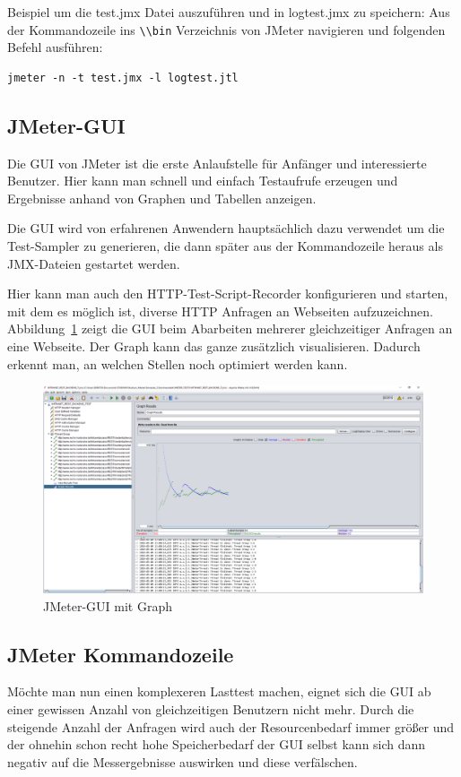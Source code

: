\documentclass[a4paper,12pt]{article}
\newcommand{\codeInLine}[1]{%
\colorbox{graybackgroundColor}{\lstinline{#1}} %
}
\begin{document}
Beispiel um die test.jmx Datei auszuführen und in logtest.jmx zu speichern: Aus der Kommandozeile ins \codeInLine{\\bin} Verzeichnis von JMeter navigieren und folgenden Befehl ausführen: \
\begin{lstlisting}
jmeter -n -t test.jmx -l logtest.jtl
\end{lstlisting}

\subsection{JMeter-GUI}
Die GUI von JMeter ist die erste Anlaufstelle für Anfänger und interessierte Benutzer. Hier kann man schnell und einfach Testaufrufe erzeugen und Ergebnisse anhand von Graphen und Tabellen anzeigen. 

Die GUI wird von erfahrenen Anwendern hauptsächlich dazu verwendet um die Test-Sampler zu generieren, die dann später aus der Kommandozeile heraus als JMX-Dateien gestartet werden.

Hier kann man auch den HTTP-Test-Script-Recorder konfigurieren und starten, mit dem es möglich ist, diverse HTTP Anfragen an Webseiten aufzuzeichnen. Abbildung~\ref{fig:gui_graph} zeigt die GUI beim Abarbeiten mehrerer gleichzeitiger Anfragen an eine Webseite. Der Graph kann das ganze zusätzlich visualisieren. Dadurch erkennt man, an welchen Stellen noch  optimiert werden kann.

\begin{figure}[htb]%
 \centering
    \includegraphics[width=1\textwidth]{bilder/jmeter_2.png}
  \caption{JMeter-GUI mit Graph}
  \label{fig:gui_graph}
\end{figure}

\subsection{JMeter Kommandozeile}
\label{chap:jmeter_commandline}
Möchte man nun einen komplexeren Lasttest machen, eignet sich die GUI ab einer gewissen Anzahl von gleichzeitigen Benutzern nicht mehr. Durch die steigende Anzahl der Anfragen wird auch der Resourcenbedarf immer größer und der ohnehin schon recht hohe Speicherbedarf der GUI selbst kann sich dann negativ auf die Messergebnisse auswirken und diese verfälschen.
\end{document}
